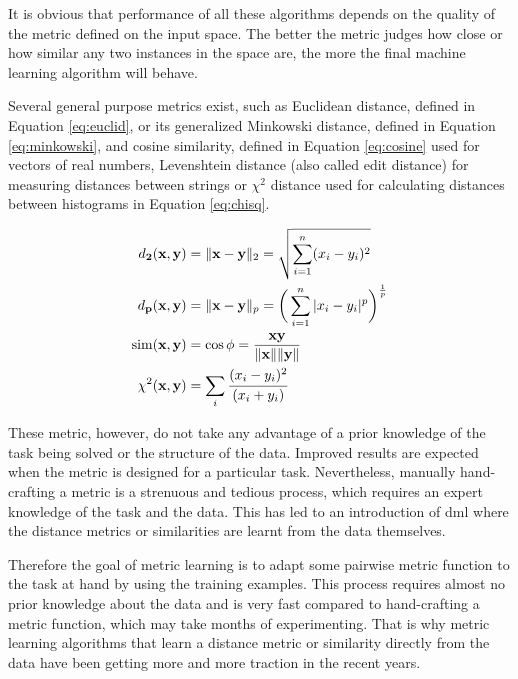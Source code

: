 \documentclass[12pt,a4paper]{report}
\begin{document}
It is obvious that performance of all these algorithms depends on the quality of the metric defined on the input space. The better the metric judges how close or how similar any two instances in the space are, the more the final machine learning algorithm will behave.

Several general purpose metrics exist, such as Euclidean distance, defined in Equation \ref{eq:euclid}, or its generalized Minkowski distance, defined in Equation \ref{eq:minkowski}, and cosine similarity, defined in Equation \ref{eq:cosine} used for vectors of real numbers, Levenshtein distance (also called edit distance) for measuring distances between strings or $\chi^2$ distance used for calculating distances between histograms in Equation \ref{eq:chisq}.

\begin{align}
d_{\mathbf{2}}(\textbf{x}, \textbf{y}) &= \|\textbf{x}-\textbf{y}\|_2 = \sqrt{\sum_{i=1}^{n} (x_i-y_i)^2} \label{eq:euclid} \\
d_{\mathbf{p}}(\textbf{x}, \textbf{y}) &= \|\textbf{x}-\textbf{y}\|_p = \bigg(\sum_{i=1}^{n} |x_i-y_i|^p\bigg)^\frac{1}{p} \label{eq:minkowski} \\
\mathrm{sim}(\textbf{x}, \textbf{y}) &= \cos{\phi} = \frac{\textbf{x}\textbf{y}}{\|\textbf{x}\|\|\textbf{y}\|} \label{eq:cosine} \\
\chi^2(\textbf{x}, \textbf{y}) &= \sum_{i} \cfrac{(x_i - y_i)^2} {(x_i + y_i)} \label{eq:chisq}
\end{align}

These metric, however, do not take any advantage of a prior knowledge of the task being solved or the structure of the data. Improved results are expected when the metric is designed for a particular task. Nevertheless, manually hand-crafting a metric is a strenuous and tedious process, which requires an expert knowledge of the task and the data. This has led to an introduction of \ac{dml} where the distance metrics or similarities are learnt from the data themselves.

Therefore the goal of metric learning is to adapt some pairwise metric function to the task at hand by using the training examples. This process requires almost no prior knowledge about the data and is very fast compared to hand-crafting a metric function, which may take months of experimenting. That is why metric learning algorithms that learn a distance metric or similarity directly from the data have been getting more and more traction in the recent years.
\end{document}

